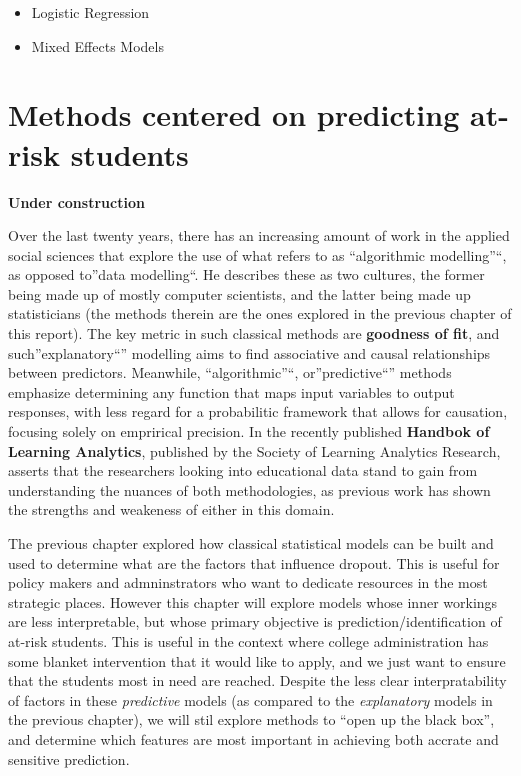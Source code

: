 \documentclass[]{book}
\providecommand{\tightlist}{%
  \setlength{\itemsep}{0pt}\setlength{\parskip}{0pt}}
\theoremstyle{definition}
\theoremstyle{definition}
\theoremstyle{remark}
\begin{document}
\begin{itemize}
\tightlist
\item
  Logistic Regression
\item
  Mixed Effects Models
\end{itemize}

\hypertarget{predictive}{\chapter{Methods centered on predicting at-risk
students}\label{predictive}}

\textbf{Under construction}

Over the last twenty years, there has an increasing amount of work in
the applied social sciences that explore the use of what
\citep{breiman2001twocultures} refers to as ``algorithmic modelling''``,
as opposed to''data modelling``. He describes these as two cultures, the
former being made up of mostly computer scientists, and the latter being
made up statisticians (the methods therein are the ones explored in the
previous chapter of this report). The key metric in such classical
methods are \textbf{goodness of fit}, and such''explanatory``''
modelling aims to find associative and causal relationships between
predictors. Meanwhile, ``algorithmic''``, or''predictive``'' methods
emphasize determining any function that maps input variables to output
responses, with less regard for a probabilitic framework that allows for
causation, focusing solely on emprirical
precision\citep{shmueli2010explain}. In the recently published
\textbf{Handbok of Learning Analytics}\citep{hla2017}, published by the
Society of Learning Analytics Research, \citep{bergner_measurement_2017}
asserts that the researchers looking into educational data stand to gain
from understanding the nuances of both methodologies, as previous work
has shown the strengths and weakeness of either in this domain.

The previous chapter explored how classical statistical models can be
built and used to determine what are the factors that influence dropout.
This is useful for policy makers and admninstrators who want to dedicate
resources in the most strategic places. However this chapter will
explore models whose inner workings are less interpretable, but whose
primary objective is prediction/identification of at-risk students. This
is useful in the context where college administration has some blanket
intervention that it would like to apply, and we just want to ensure
that the students most in need are reached. Despite the less clear
interpratability of factors in these \emph{predictive} models (as
compared to the \emph{explanatory} models in the previous chapter), we
will stil explore methods to ``open up the black box'', and determine
which features are most important in achieving both accrate and
sensitive prediction.
\end{document}

